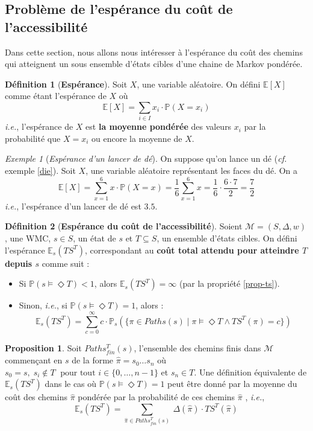 \documentclass[12pt,a4paper]{report}
\theoremstyle{definition}%
\newtheorem{definition}{Définition}[chapter]
\newtheorem{proposition}{Proposition}[chapter]
\theoremstyle{remark}
\newtheorem{example}{Exemple}[chapter]
\newcommand{\ie}{\textit{i.e.}, }
\newcommand{\cf}{\textit{cf.} }
\newcommand{\pr}{\mathbb{P}}
\let\labelitemi\labelitemii
\begin{document}
\subsection{Problème de l'espérance du coût de l'accessibilité}
Dans cette section, nous allons nous intéresser à l'espérance du coût des chemins qui atteignent un sous ensemble d'états cibles d'une chaine de Markov pondérée.
\begin{definition}[\textbf{Espérance}]
	Soit $X$, une variable aléatoire. On défini $\mathbb{E}[X]$ comme étant l'espérance de $X$ où 
	\[\mathbb{E}[X] = \sum_{i \in I}x_i \cdot \pr(X = x_i) \]
	\ie l'espérance de $X$ est \textbf{la moyenne pondérée} des valeurs $x_i$ par la probabilité que $X = x_i$ ou encore la moyenne de $X$.
	\cite{Course2}
\end{definition}
\begin{example}[\textit{Espérance d'un lancer de dé}]
	On suppose qu'on lance un dé (\cf exemple \ref{die}). Soit $X$, une variable aléatoire représentant les faces du dé. On a 
	\[ \mathbb{E}[X] = \sum_{x = 1}^6 x \cdot \pr(X = x)  = \frac{1}{6} \sum_{x = 1}^6 x = \frac{1}{6} \cdot \frac{6 \cdot 7}{2} = \frac{7}{2}\] \ie l'espérance d'un lancer de dé est $3.5$.
\end{example}

\begin{definition}[\textbf{Espérance du coût de l'accessibilité}]
	Soient $\mathcal{M} = (S, \Delta, w)$, une WMC, $s \in S$, un état de $s$ et $T \subseteq S$, un ensemble d'états cibles. On défini l'espérance $\mathbb{E}_s(TS^T)$, correspondant au \textbf{coût total attendu pour atteindre $T$ depuis $s$} comme suit :
	\begin{itemize}
	\renewcommand{\labelitemi}{\tiny$\bullet$}
	\item 	Si $\pr(s \models \Diamond T) < 1$, alors $\mathbb{E}_s(TS^T) = \infty$ (par la propriété \ref{prop-ts}).
	\item Sinon, \ie si $\pr(s \models \Diamond T) = 1$, alors :
	\[ \mathbb{E}_s(TS^T) = \sum_{c = 0}^\infty c \cdot \pr_s(\{\pi \in Paths(s) \; | \; \pi \models \Diamond T \wedge TS^T(\pi) = c \})\]
	\end{itemize}
\end{definition}

\begin{proposition}
			Soit $Paths_{fin}^T(s)$, l'ensemble des chemins finis dans $\mathcal{M}$ commençant en $s$ de la forme $\hat{\pi} = s_0 \dots s_n$ où $s_0 = s, \;  s_i \notin T \; \text{ pour tout } i \in \{0, \dots, n-1\}$ et $s_n \in T$. Une définition équivalente de $\mathbb{E}_s(TS^T)$ dans le cas où $\pr(s \models \Diamond T) = 1$ peut être donné par la moyenne du coût des chemins $\hat{\pi}$ pondérée par la probabilité de ces chemins $\hat{\pi}$ %
	, \ie
	\[\mathbb{E}_s(TS^T) = \sum_{\hat{\pi} \in Paths_{fin}^T(s)}\ \Delta(\hat{\pi}) \cdot TS^T(\hat{\pi})\]
\end{proposition}
\end{document}
